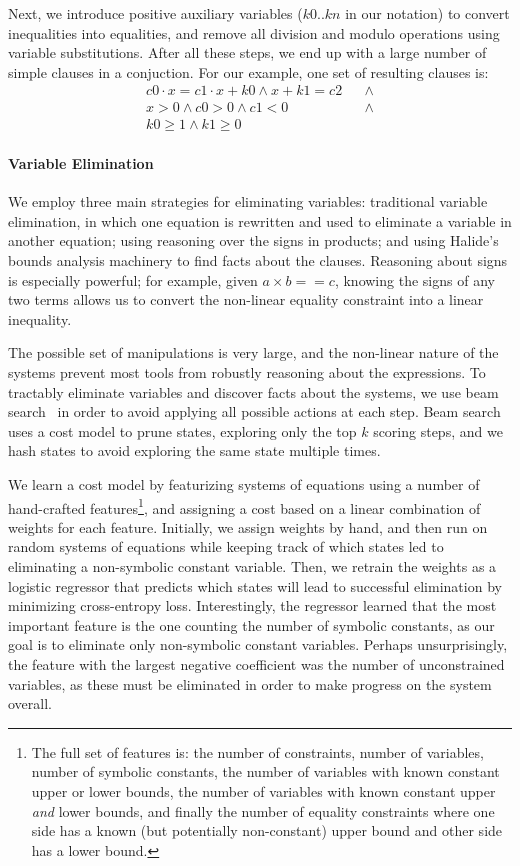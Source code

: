 \documentclass[sigplan,10pt,review,anonymous]{acmart}\settopmatter{printfolios=true,printccs=false,printacmref=false}
\begin{document}
Next, we introduce positive auxiliary variables ($k0..kn$ in our notation) to convert
inequalities into equalities, and remove all division and modulo operations using
variable substitutions.  After all these steps, we end up with a large number of simple
clauses in a conjuction.  For our example, one set of resulting clauses is:
\begin{align*}
c0 \cdot x = c1 \cdot x + k0  \wedge x + k1 = c2 & & \wedge \\
x > 0 \wedge
c0 > 0 \wedge 
c1 < 0 & & \wedge  \\
k0 \geq 1 \wedge k1 \geq 0 & &
\end{align*}

\paragraph{Variable Elimination} We employ three main strategies for eliminating
variables: traditional variable elimination, in which one equation is rewritten and
used to eliminate a variable in another equation; using reasoning over the signs in products;
and using Halide's bounds analysis machinery to find facts about the clauses.  Reasoning about signs
is especially powerful; for example, given $a \times b == c$, knowing the signs of any
two terms allows us to convert the non-linear equality constraint into a linear inequality.

The possible
set of manipulations is very large, and the non-linear nature of the systems prevent most
tools from robustly reasoning about the expressions.  To tractably eliminate variables and discover
facts about the systems, we use beam search~\cite{beamsearch} in order to avoid applying
all possible actions at each step.  Beam search uses a cost model to prune states, exploring
only the top $k$ scoring steps, and we hash states to avoid exploring the same state multiple
times.

We learn a cost model by featurizing systems of equations using a number of hand-crafted
features\footnote{The full set of features is: the number of constraints, number of variables,
  number of symbolic constants, the number of variables with known constant upper or lower bounds,
  the number of variables with known constant upper \textit{and} lower bounds, and finally the number of
  equality constraints where one side has a known (but potentially non-constant) upper bound and other side has a lower bound.},
and assigning a cost based on a linear combination of weights for each feature.  Initially,
we assign weights by hand, and then run on random systems of equations while keeping track
of which states led to eliminating a non-symbolic constant variable.  Then, we retrain the weights
as a logistic regressor that predicts which states will lead to successful elimination
by minimizing cross-entropy loss.  Interestingly, the regressor learned that the most
important feature is the one counting the number of symbolic constants, as our goal
is to eliminate only non-symbolic constant variables.  Perhaps unsurprisingly, the feature
with the largest negative coefficient was the number of unconstrained variables, as
these must be eliminated in order to make progress on the system overall.
\end{document}

